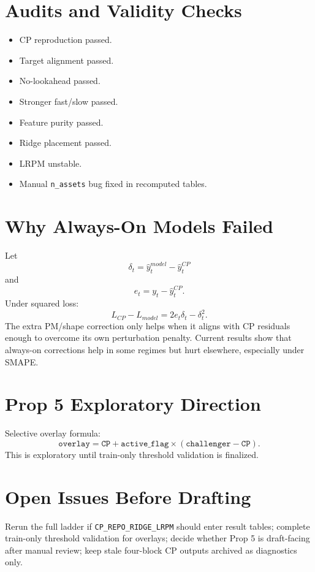 \section{Audits and Validity Checks}
\begin{itemize}
\item CP reproduction passed.
\item Target alignment passed.
\item No-lookahead passed.
\item Stronger fast/slow passed.
\item Feature purity passed.
\item Ridge placement passed.
\item LRPM unstable.
\item Manual \texttt{n\_assets} bug fixed in recomputed tables.
\end{itemize}

\section{Why Always-On Models Failed}
Let
\[
\delta_t = \widehat{y}^{model}_t - \widehat{y}^{CP}_t
\]
and
\[
e_t = y_t - \widehat{y}^{CP}_t.
\]
Under squared loss:
\[
L_{CP} - L_{model} = 2 e_t \delta_t - \delta_t^2.
\]
The extra PM/shape correction only helps when it aligns with CP residuals enough to overcome its own perturbation penalty. Current results show that always-on corrections help in some regimes but hurt elsewhere, especially under SMAPE.

\section{Prop 5 Exploratory Direction}
Selective overlay formula:
\[
\texttt{overlay} = \texttt{CP} + \texttt{active\_flag} \times (\texttt{challenger} - \texttt{CP}).
\]
This is exploratory until train-only threshold validation is finalized.

\section{Open Issues Before Drafting}
Rerun the full ladder if \texttt{CP\_REPO\_RIDGE\_LRPM} should enter result tables; complete train-only threshold validation for overlays; decide whether Prop 5 is draft-facing after manual review; keep stale four-block CP outputs archived as diagnostics only.
